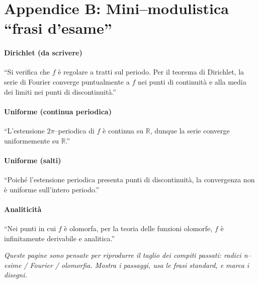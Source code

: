 \documentclass[11pt,a4paper]{article}
\newcommand{\R}{\mathbb{R}}
\theoremstyle{definition}
\begin{document}
\section*{Appendice B: Mini–modulistica “frasi d’esame”}

\paragraph{Dirichlet (da scrivere)}
“Si verifica che $f$ è regolare a tratti sul periodo. Per il teorema di Dirichlet, la serie di Fourier converge
puntualmente a $f$ nei punti di continuità e alla media dei limiti nei punti di discontinuità.”

\paragraph{Uniforme (continua periodica)}
“L’estensione $2\pi$–periodica di $f$ è continua su $\R$, dunque la serie converge uniformemente su $\R$.”

\paragraph{Uniforme (salti)}
“Poiché l’estensione periodica presenta punti di discontinuità, la convergenza non è uniforme sull’intero periodo.”

\paragraph{Analiticità}
“Nei punti in cui $f$ è olomorfa, per la teoria delle funzioni olomorfe, $f$ è infinitamente derivabile e analitica.”

\vfill
\begin{center}\small
\emph{Queste pagine sono pensate per riprodurre il taglio dei compiti passati: radici n–esime / Fourier / olomorfia. 
Mostra i passaggi, usa le frasi standard, e marca i disegni.}
\end{center}
\end{document}
